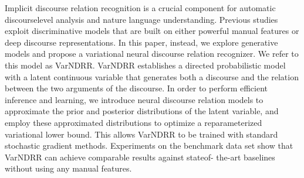 Implicit discourse relation recognition is a crucial component for automatic discourselevel analysis and nature language understanding. Previous studies exploit discriminative models that are built on either powerful manual features or deep discourse representations. In this paper, instead, we explore generative models and propose a variational neural discourse relation recognizer. We refer to this model as VarNDRR. VarNDRR establishes a directed probabilistic model with a latent continuous variable that generates both a discourse and the relation between the two arguments of the discourse. In order to perform efficient inference and learning, we introduce neural discourse relation models to approximate the prior and posterior distributions of the latent variable, and employ these approximated distributions to optimize a reparameterized variational lower bound. This allows VarNDRR to be trained with standard stochastic gradient methods. Experiments on the benchmark data set show that VarNDRR can achieve comparable results against stateof- the-art baselines without using any manual features.
